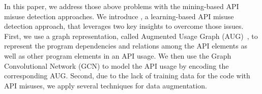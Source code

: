 
In this paper, we address those above problems with the mining-based
API misuse detection approaches. We introduce {\tool}, a
learning-based API misuse detection approach, that leverages two key
insights to overcome those issues. First, we use a graph
representation, called Augmented Usage Graph
(AUG)~\cite{mudetect-msr19}, to represent the program dependencies and
relations among the API elements as well as other program elements in
an API usage. We then use the Graph Convolutional Network (GCN) to
model the API usage by encoding the corresponding AUG. Second, due to
the lack of training data for the code with API misuses, we apply
several techniques for data augmentation.


